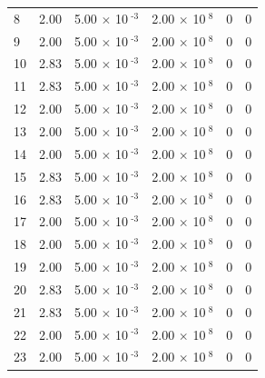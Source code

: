 \documentclass[a4paper,11pt]{article}
\begin{document}
\begin{center}
\begin{longtable}{|R{1.5cm}|R{2.4cm}|R{2.4cm}|R{2.4cm}|R{2.4cm}|R{2.4cm}|}
    8 &   2.00  &         5.00 $\times$ 10$^{\text{          -3}}$  &         2.00 $\times$ 10$^{\text{           8}}$  & 0  & 0 \\
    9 &   2.00  &         5.00 $\times$ 10$^{\text{          -3}}$  &         2.00 $\times$ 10$^{\text{           8}}$  & 0  & 0 \\
   10 &   2.83  &         5.00 $\times$ 10$^{\text{          -3}}$  &         2.00 $\times$ 10$^{\text{           8}}$  & 0  & 0 \\
   11 &   2.83  &         5.00 $\times$ 10$^{\text{          -3}}$  &         2.00 $\times$ 10$^{\text{           8}}$  & 0  & 0 \\
   12 &   2.00  &         5.00 $\times$ 10$^{\text{          -3}}$  &         2.00 $\times$ 10$^{\text{           8}}$  & 0  & 0 \\
   13 &   2.00  &         5.00 $\times$ 10$^{\text{          -3}}$  &         2.00 $\times$ 10$^{\text{           8}}$  & 0  & 0 \\
   14 &   2.00  &         5.00 $\times$ 10$^{\text{          -3}}$  &         2.00 $\times$ 10$^{\text{           8}}$  & 0  & 0 \\
   15 &   2.83  &         5.00 $\times$ 10$^{\text{          -3}}$  &         2.00 $\times$ 10$^{\text{           8}}$  & 0  & 0 \\
   16 &   2.83  &         5.00 $\times$ 10$^{\text{          -3}}$  &         2.00 $\times$ 10$^{\text{           8}}$  & 0  & 0 \\
   17 &   2.00  &         5.00 $\times$ 10$^{\text{          -3}}$  &         2.00 $\times$ 10$^{\text{           8}}$  & 0  & 0 \\
   18 &   2.00  &         5.00 $\times$ 10$^{\text{          -3}}$  &         2.00 $\times$ 10$^{\text{           8}}$  & 0  & 0 \\
   19 &   2.00  &         5.00 $\times$ 10$^{\text{          -3}}$  &         2.00 $\times$ 10$^{\text{           8}}$  & 0  & 0 \\
   20 &   2.83  &         5.00 $\times$ 10$^{\text{          -3}}$  &         2.00 $\times$ 10$^{\text{           8}}$  & 0  & 0 \\
   21 &   2.83  &         5.00 $\times$ 10$^{\text{          -3}}$  &         2.00 $\times$ 10$^{\text{           8}}$  & 0  & 0 \\
   22 &   2.00  &         5.00 $\times$ 10$^{\text{          -3}}$  &         2.00 $\times$ 10$^{\text{           8}}$  & 0  & 0 \\
   23 &   2.00  &         5.00 $\times$ 10$^{\text{          -3}}$  &         2.00 $\times$ 10$^{\text{           8}}$  & 0  & 0 \\

\end{longtable}
\end{center}
\end{document}

